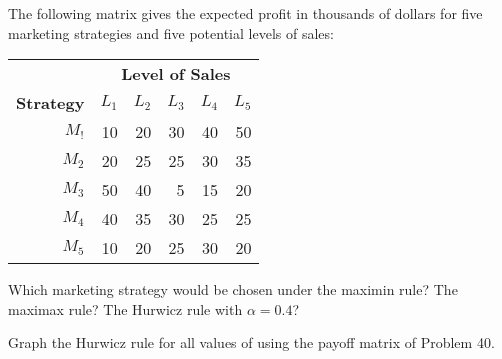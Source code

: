 \begin{exercises}
    \begin{exercise}
    \label{sea-07-41}
        The following matrix gives the expected profit in thousands of dollars for five marketing strategies and five potential levels of sales:
        \begin{table}[h]
        \centering
        \begin{tabular}{r r r r r r}
        \toprule
         & \multicolumn{5}{c}{\textbf{Level of Sales}} \\
        \textbf{Strategy} & \textbf{$L_1$} & \textbf{$L_2$} & \textbf{$L_3$} & \textbf{$L_4$} & \textbf{$L_5$} \\
        \midrule
        $M_!$ & 10 & 20 & 30 & 40 & 50 \\
        $M_2$ & 20 & 25 & 25 & 30 & 35 \\
        $M_3$ & 50 & 40 &  5 & 15 & 20 \\
        $M_4$ & 40 & 35 & 30 & 25 & 25 \\
        $M_5$ & 10 & 20 & 25 & 30 & 20 \\
        \bottomrule
        \end{tabular}
        \label{tab:sea-07-41} %
        \end{table}
        Which marketing strategy would be chosen under the maximin rule? The maximax rule? The Hurwicz rule with $\alpha=0.4$?
    \end{exercise}
    \begin{solution}
    \end{solution}
    
    \begin{exercise}
    \label{sea-07-42}
        Graph the Hurwicz rule for all values of   using the payoff matrix of Problem 40.
    \end{exercise}
    \begin{solution}
    \end{solution}
    

\end{exercises}
